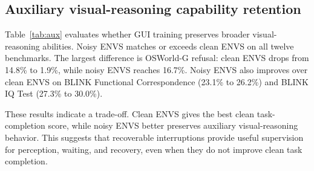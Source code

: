 \documentclass[11pt]{article}
\begin{document}
\subsection{Auxiliary visual-reasoning capability retention}
\label{sec:diversity}

Table~\ref{tab:aux} evaluates whether GUI training preserves broader
visual-reasoning abilities. Noisy ENVS matches or exceeds clean ENVS on
all twelve benchmarks. The largest difference is OSWorld-G refusal:
clean ENVS drops from 14.8\% to 1.9\%, while noisy ENVS reaches 16.7\%.
Noisy ENVS also improves over clean ENVS on BLINK Functional
Correspondence (23.1\% to 26.2\%) and BLINK IQ Test (27.3\% to 30.0\%).

These results indicate a trade-off. Clean ENVS gives the best clean
task-completion score, while noisy ENVS better preserves auxiliary
visual-reasoning behavior. This suggests that recoverable interruptions
provide useful supervision for perception, waiting, and recovery, even
when they do not improve clean task completion.
\end{document}
